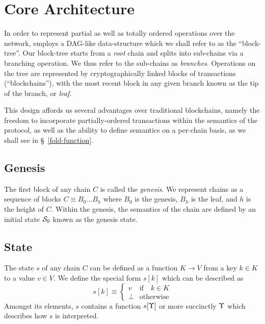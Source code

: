 \section{Core Architecture}

In order to represent partial as well as totally ordered operations over the
network, \oscoin{} employs a DAG-like data-structure which we shall refer to as
the ``block-tree''.  Our block-tree starts from a \emph{root} chain and splits
into sub-chains via a branching operation. We thus refer to the sub-chains as
\emph{branches}.  Operations on the tree are represented by cryptographically
linked blocks of transactions (``blockchains''), with the most recent block in
any given branch known as the tip of the branch, or \emph{leaf}.

This design affords us several advantages over traditional blockchains, namely
the freedom to incorporate partially-ordered transactions within the semantics
of the protocol, as well as the ability to define semantics on a per-chain
basis, as we shall see in \S~\ref{fold-function}.


\subsection{Genesis}

The first block of any chain $C$ is called the \emph{genesis}. We represent
chains as a sequence of blocks $C \equiv B_0 \dots B_h$ where $B_0$ is the
genesis, $B_h$ is the leaf, and $h$ is the height of $C$. Within the
genesis, the semantics of the chain are defined by an initial state $\mathcal{S}_0$
known as the genesis state.

\subsection{State}

The state $s$ of any chain $C$ can be defined as a function $K \to V$ from
a key $k \in K$ to a value $v \in V$. We define the special form $s[k]$ which
can be described as
\[
    s[k] \equiv \begin{cases}
        v                   & \text{if} \quad k \in K \\
        \bot                & \text{otherwise}
    \end{cases}
\]
Amongst its elements, $s$ contains a function $s[\Upsilon]$ or more succinctly
$\Upsilon$ which describes how $s$ is interpreted.

